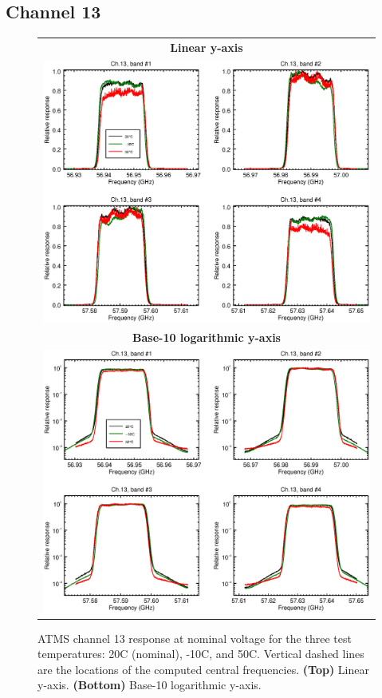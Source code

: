 \subsection{Channel 13}
\begin{figure}[H]
  \label{fig:Tset.ch13_response}
  \centering
  \begin{tabular}{c}
    \hspace{0.75cm}\sffamily\textbf{Linear y-axis} \\
    \includegraphics[scale=0.55]{graphics/srf/Tset/lin/atms_npp-13.eps} \\
    \hspace{0.75cm}\sffamily\textbf{Base-10 logarithmic y-axis} \\
    \includegraphics[scale=0.55]{graphics/srf/Tset/log/atms_npp-13.eps}
  \end{tabular}
  \caption{ATMS channel 13 response at nominal voltage for the three test temperatures: 20\textdegree{}C (nominal), -10\textdegree{}C, and 50\textdegree{}C. Vertical dashed lines are the locations of the computed central frequencies. \textbf{(Top)} Linear y-axis. \textbf{(Bottom)} Base-10 logarithmic y-axis.}
\end{figure}

